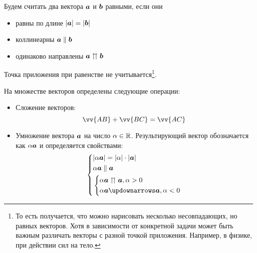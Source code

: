 \documentclass[a4paper,12pt]{article}
\begin{document}
  \begin{definition}
    Будем считать два вектора $\boldsymbol a$ и $\boldsymbol b$ равными, если они
    \begin{itemize}
      \item равны по длине $|\boldsymbol a| = |\boldsymbol b|$
      \item коллинеарны $\boldsymbol a \parallel \boldsymbol b$
      \item одинаково направлены $\boldsymbol a \upuparrows \boldsymbol b$
    \end{itemize}
    Точка приложения при равенстве не учитывается\footnote{То есть получается, что можно нарисовать несколько несовпадающих, но равных векторов. Хотя в зависимости от конкретной задачи может быть важным различать векторы с разной точкой приложения. Например, в физике, при действии сил на тело.}.
  \end{definition}
  
  На множестве векторов определены следующие операции:
  \begin{itemize}
    \item Сложение векторов:
      \[
        \vv{AB} + \vv{BC} = \vv{AC}
      \]
    \item Умножение вектора $\boldsymbol a$ на число $\alpha \in \operatorname{\mathbb R}$.
      Результирующий вектор обозначается как $\alpha \boldsymbol a$ и определяется свойствами:
      \[
        \left\{
          \begin{aligned}
            &|\alpha \bds a| = |\alpha| \cdot |\bds a|\\
            &\alpha \bds a \parallel \bds a\\
            &\left\{
               \begin{aligned}
                 &\alpha \bds a \upuparrows \bds a, \alpha > 0\\
                 &\alpha \bds a \updownarrows \bds a, \alpha < 0
               \end{aligned}
             \right.
          \end{aligned}
        \right.
      \]
  \end{itemize}
  
\end{document}
